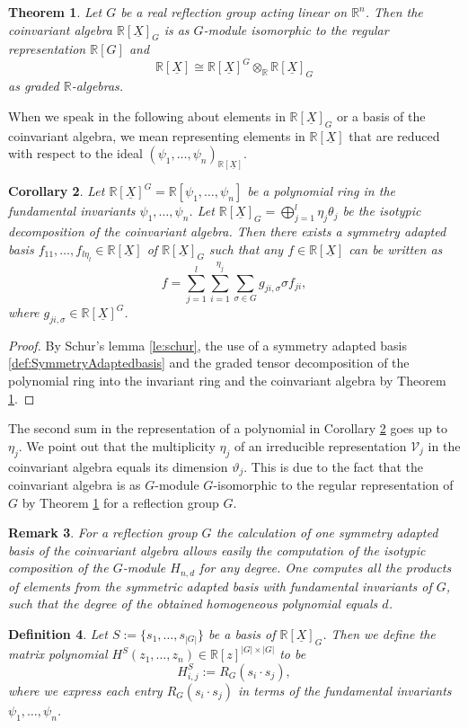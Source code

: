 \documentclass[11pt,a4paper]{amsart}
\numberwithin{equation}{section}
\newtheorem{thm}{Theorem}
\newtheorem{cor}[thm]{Corollary}
\newtheorem{definition}[thm]{Definition}
\newtheorem{remark}[thm]{Remark}
\theoremstyle{definition}
\newcommand{\R}{\mathbb{R}}
\numberwithin{thm}{section}
\theoremstyle{break}
\numberwithin{subcase}{case}
\begin{document}
\begin{thm}\cite{lehrer2009unitary} \label{thm:coinvariant algebra}
Let $G$ be a real reflection group acting linear on $\R^n$. Then the coinvariant algebra $\R[\underline{X}]_G$ is as $G$-module isomorphic to the regular representation $\R[G]$ and $$\R[\underline{X}] \cong \R[\underline{X}]^G \otimes_\R \R[\underline{X}]_G$$ as graded $\R$-algebras.  
\end{thm}
When we speak in the following about elements in $\R[\underline{X}]_G$ or a basis of the coinvariant algebra, we mean representing elements in $\R[\underline{X}]$ that are reduced with respect to the ideal $(\psi_1,\ldots,\psi_n)_{\R[\underline{X}]}$.

\begin{cor} \label{cor:deomposition of polynomial ring}
Let $\R[\underline{X}]^G= \R[\psi_1,\ldots,\psi_n]$ be a polynomial ring in the fundamental invariants $\psi_1,\ldots,\psi_n$. Let $\R[\underline{X}]_G = \bigoplus_{j=1}^l \eta_j \theta_j$ be the isotypic decomposition of the coinvariant algebra. Then there exists a symmetry adapted basis $f_{11},\ldots,f_{l\eta_l} \in \R[\underline{X}]$ of $\R[\underline{X}]_G$ such that any $f \in \R[\underline{X}]$ can be written as $$f =  \sum_{j=1}^l \sum_{i=1}^{\eta_j} \sum_{\sigma \in G} g_{ji,\sigma} \sigma f_{ji}, $$ where $g_{ji,\sigma} \in \R[\underline{X}]^G$.
\end{cor}
\begin{proof}
By Schur's lemma \ref{le:schur}, the use of a symmetry adapted basis \ref{def:SymmetryAdaptedbasis} and the graded tensor decomposition of the polynomial ring into the invariant ring and the coinvariant algebra by Theorem \ref{thm:coinvariant algebra}.
\end{proof}
The second sum in the representation of a polynomial in Corollary \ref{cor:deomposition of polynomial ring} goes up to $\eta_j$. We point out that the multiplicity $\eta_j$ of an irreducible representation $\mathcal{V}_j$ in the coinvariant algebra equals its dimension $\vartheta_j$. This is due to the fact that the coinvariant algebra is as $G$-module $G$-isomorphic to the regular representation of $G$ by Theorem \ref{thm:coinvariant algebra} for a reflection group $G$.     
\begin{remark}
For a reflection group $G$ the calculation of one symmetry adapted basis of the coinvariant algebra allows easily the computation of the isotypic composition of the $G$-module $H_{n,d}$ for any degree. One computes all the products of elements from the symmetric adapted basis with fundamental invariants of $G$, such that the degree of the obtained homogeneous polynomial equals $d$. 
\end{remark}
\begin{definition}
Let $S:=\{s_1,\ldots,s_{|G|}\}$ be a basis of $\R[\underline{X}]_G$. Then we define the matrix polynomial $H^S(z_1,\ldots,z_n)\in\R[z]^{|G| \times |G|}$ to be
$$H^S_{i,j}:=R_G(s_i\cdot s_j),$$
where we express each entry $R_G(s_i\cdot s_j)$ in terms of the fundamental invariants $\psi_1,\ldots,\psi_n$.
\end{definition}
\end{document}

